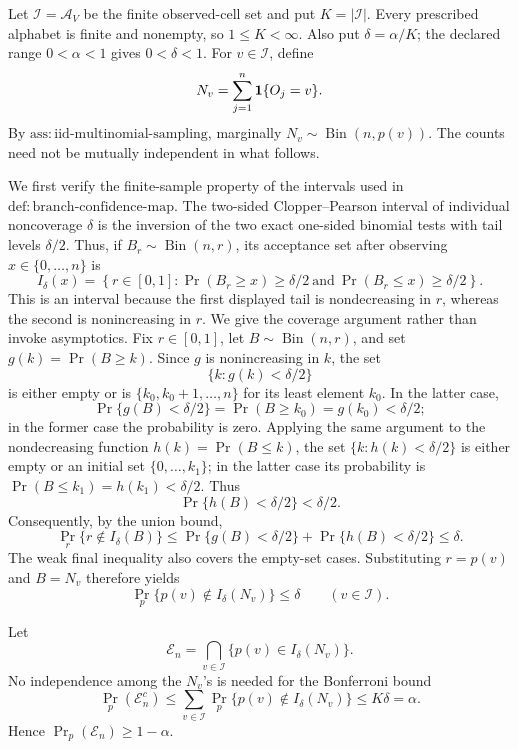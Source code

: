 Let \(\mathcal I=\mathcal A_V\) be the finite observed-cell set and put \(K=|\mathcal I|\).  Every prescribed alphabet is finite and nonempty, so \(1\leq K<\infty\).  Also put \(\delta=\alpha/K\); the declared range \(0<\alpha<1\) gives \(0<\delta<1\).  For \(v\in\mathcal I\), define
\[
 N_v=\sum_{j=1}^n {\bf 1}\{O_j=v\}.
\]
By \(\mathrm{ass:iid\text{-}multinomial\text{-}sampling}\), marginally \(N_v\sim\operatorname{Bin}(n,p(v))\).  The counts need not be mutually independent in what follows.

We first verify the finite-sample property of the intervals used in \(\mathrm{def:branch\text{-}confidence\text{-}map}\).  The two-sided Clopper--Pearson interval of individual noncoverage \(\delta\) is the inversion of the two exact one-sided binomial tests with tail levels \(\delta/2\).  Thus, if \(B_r\sim\operatorname{Bin}(n,r)\), its acceptance set after observing \(x\in\{0,\ldots,n\}\) is
\[
 I_\delta(x)
 =\left\{r\in[0,1]:
       \Pr(B_r\geq x)\geq\delta/2
       \ \text{and}\ 
       \Pr(B_r\leq x)\geq\delta/2
   \right\}.
\]
This is an interval because the first displayed tail is nondecreasing in \(r\), whereas the second is nonincreasing in \(r\).  We give the coverage argument rather than invoke asymptotics.  Fix \(r\in[0,1]\), let \(B\sim\operatorname{Bin}(n,r)\), and set \(g(k)=\Pr(B\geq k)\).  Since \(g\) is nonincreasing in \(k\), the set
\[
 \{k:g(k)<\delta/2\}
\]
is either empty or is \(\{k_0,k_0+1,\ldots,n\}\) for its least element \(k_0\).  In the latter case,
\[
 \Pr\{g(B)<\delta/2\}=\Pr(B\geq k_0)=g(k_0)<\delta/2;
\]
in the former case the probability is zero.  Applying the same argument to the nondecreasing function \(h(k)=\Pr(B\leq k)\), the set \(\{k:h(k)<\delta/2\}\) is either empty or an initial set \(\{0,\ldots,k_1\}\); in the latter case its probability is \(\Pr(B\leq k_1)=h(k_1)<\delta/2\).  Thus
\[
 \Pr\{h(B)<\delta/2\}<\delta/2.
\]
Consequently, by the union bound,
\[
 \Pr_r\{r\notin I_\delta(B)\}
 \leq
 \Pr\{g(B)<\delta/2\}+\Pr\{h(B)<\delta/2\}
 \leq\delta.
\]
The weak final inequality also covers the empty-set cases.  Substituting \(r=p(v)\) and \(B=N_v\) therefore yields
\[
 \Pr_p\{p(v)\notin I_\delta(N_v)\}\leq\delta
 \qquad(v\in\mathcal I).
\]

Let
\[
 \mathcal E_n=\bigcap_{v\in\mathcal I}
 \{p(v)\in I_\delta(N_v)\}.
\]
No independence among the \(N_v\)'s is needed for the Bonferroni bound
\[
 \Pr_p(\mathcal E_n^c)
 \leq\sum_{v\in\mathcal I}
       \Pr_p\{p(v)\notin I_\delta(N_v)\}
 \leq K\delta=\alpha.
\]
Hence \(\Pr_p(\mathcal E_n)\geq1-\alpha\).

